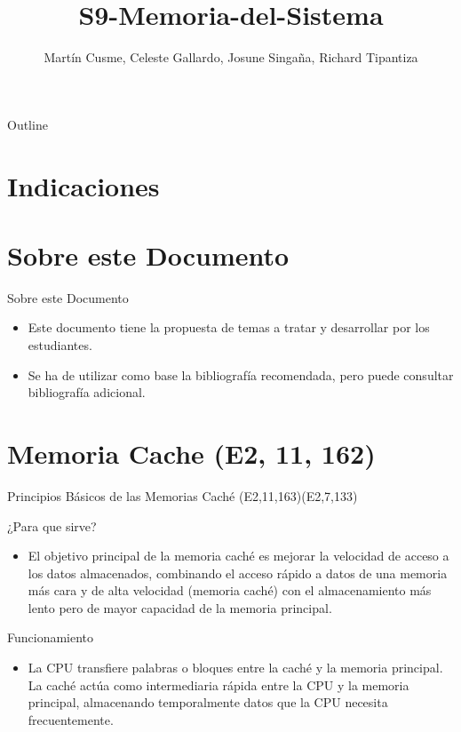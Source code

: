 \documentclass[presentation]{beamer}
\author{Martín Cusme, Celeste Gallardo, Josune Singaña, Richard Tipantiza}
\date{}
\title{S9-Memoria-del-Sistema}
\begin{document}
\maketitle
\begin{frame}{Outline}
\tableofcontents
\end{frame}



\section{Indicaciones}
\label{sec:org7bd62b7}


\section{Sobre este Documento}
\label{sec:org33062df}
\begin{frame}[label={sec:org51ae47d}]{Sobre este Documento}
\begin{itemize}
\item Este documento tiene la propuesta de temas a tratar y desarrollar por los estudiantes.
\item Se ha de utilizar como base la bibliografía recomendada, pero puede consultar bibliografía adicional.
\end{itemize}
\end{frame}


\section{Memoria Cache (E2, 11, 162)}
\label{sec:orgf8461de}
\begin{frame}[label={sec:org981fb3b}]{Principios Básicos de las Memorias Caché (E2,11,163)(E2,7,133)}
\begin{block}{¿Para que sirve?}
\begin{itemize}
\item El objetivo principal de la memoria caché es mejorar la velocidad de acceso a los datos almacenados, combinando el acceso rápido a datos de una memoria más cara y de alta velocidad (memoria caché) con el almacenamiento más lento pero de mayor capacidad de la memoria principal.
\end{itemize}
\end{block}

\begin{block}{Funcionamiento}
\begin{itemize}
\item La CPU transfiere palabras o bloques entre la caché y la memoria principal. La caché actúa como intermediaria rápida entre la CPU y la memoria principal, almacenando temporalmente datos que la CPU necesita frecuentemente.
\end{itemize}
\end{block}
\end{frame}
\end{document}
